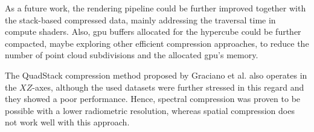 As a future work, the rendering pipeline could be further improved together with the stack-based compressed data, mainly addressing the traversal time in compute shaders. Also, \acrshort{gpu} buffers allocated for the hypercube could be further compacted, maybe exploring other efficient compression approaches, to reduce the number of point cloud subdivisions and the allocated \acrshort{gpu}'s memory. 

\begin{kaobox}[frametitle=QuadStack compression of spatial data in hypercubes]
The QuadStack compression method proposed by Graciano et al. \cite{graciano_quadstack_2021} also operates in the $XZ$-axes, although the used datasets were further stressed in this regard and they showed a poor performance. Hence, spectral compression was proven to be possible with a lower radiometric resolution, whereas spatial compression does not work well with this approach.  
\end{kaobox}